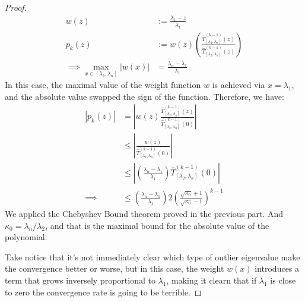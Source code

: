 \documentclass[]{article}
\theoremstyle{definition}
\begin{document}
            \begin{proof}
                \begin{align}
                    w(z) &:=  \frac{\lambda_1 - z}{\lambda_1} 
                    \\
                    p_k(z) &:= w(z)\left(
                        \frac{\hat{T}_{[\lambda_2, \lambda_n]}^{(k - 1)}(z)}
                        {
                            \hat{T}_{[\lambda_2, \lambda_n]}^{(k - 1)}(z)
                        }
                    \right)
                    \\\implies
                    \max_{x\in[\lambda_2, \lambda_n]} |w(x)| &=
                    \frac{\lambda_n - \lambda_1}{\lambda_1}
                \end{align}
                In this case, the maximal value of the weight function $w$ is achieved via $x = \lambda_1$, and the absolute value swapped the sign of the function. Therefore, we have: 
                \begin{align}
                    |p_k(z)| &= 
                    \left|
                        w(z) 
                        \frac{\hat{T}_{[\lambda_2, \lambda_n]}^{(k - 1)}(z)}
                        {
                            \hat{T}_{[\lambda_2, \lambda_n]}^{(k - 1)}(0)
                        }
                    \right|
                    \\
                    &\le 
                    \left|
                        \frac{w(z)}{\hat{T}_{[\lambda_2, \lambda_n]}^{(k - 1)}(0)}
                    \right|
                    \\
                    & \le
                    \left| 
                        \left(
                            \frac{\lambda_n - \lambda_1}{\lambda_1}
                        \right)
                        \hat{T}_{[\lambda_2, \lambda_n]}^{(k - 1)}(0)
                    \right|
                    \\
                    \implies 
                    & \le   
                    \left(
                        \frac{\lambda_n - \lambda_1}{\lambda_1}
                    \right)
                    2\left(
                        \frac{\sqrt{\kappa_0} + 1}{\sqrt{\kappa_0} - 1}
                    \right)^{k - 1}
                \end{align}
                We applied the Chebyshev Bound theorem proved in the previous part. And $\kappa_0 = \lambda_n/\lambda_2$, and that is the maximal bound for the absolute value of the polynomial.
                \par
                Take notice that it's not immediately clear which type of outlier eigenvalue make the convergence better or worse, but in this case, the weight $w(x)$ introduces a term that grows inversely proportional to $\lambda_1$, making it clearn that if $\lambda_1$ is close to zero the convergence rate is going to be terrible. 
            \end{proof}
\end{document}
